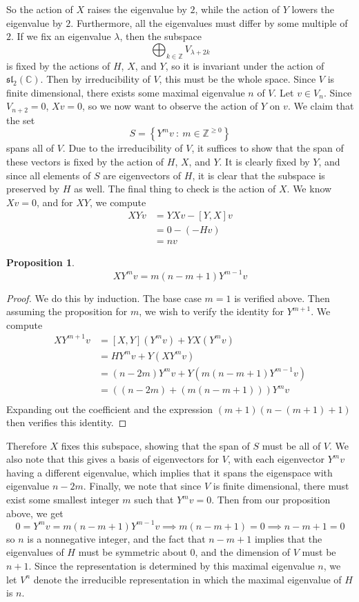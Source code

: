 \documentclass[psamsfonts]{amsart}
\newtheorem{prop}[thm]{Proposition}
\theoremstyle{definition}
\theoremstyle{remark}
\renewcommand{\sl}{\mathfrak{sl}}
\newcommand{\Z}{\mathbb{Z}}
\newcommand{\C}{\mathbb{C}}
\newcommand{\set}[1]{\left\lbrace #1 \right\rbrace}
\begin{document}
%
So the action of $X$ raises the eigenvalue by $2$, while the action of $Y$ lowers
the eigenvalue by $2$. Furthermore, all the eigenvalues must differ by some
multiple of $2$. If we fix an eigenvalue $\lambda$, then the subspace
\[
\bigoplus_{k \in \Z}V_{\lambda + 2k}
\]
is fixed by the actions of $H$, $X$, and $Y$, so it is invariant under the action
of $\sl_2(\C)$. Then by irreducibility of $V$, this must be the whole space.
Since $V$ is finite dimensional, there exists some maximal eigenvalue $n$ of $V$.
Let $v \in V_n$. Since $V_{n+2} = 0$, $Xv = 0$, so we now want to observe the action
of $Y$ on $v$. We claim that the set
\[
S = \set{Y^mv ~:~ m \in \Z^{\geq 0}}
\]
spans all of $V$. Due to the irreducibility of $V$, it suffices to show that
the span of these vectors is fixed by the action of $H$, $X$, and $Y$. It is
clearly fixed by $Y$, and since all elements of $S$ are eigenvectors of $H$, it
is clear that the subspace is preserved by $H$ as well. The final thing to
check is the action of $X$. We know $Xv = 0$, and for $XY$, we compute
%
\begin{align*}
XYv &= YXv - [Y,X]v \\
&= 0 - (-Hv) \\
&= nv
\end{align*}
%
\begin{prop}
\[
XY^mv = m(n-m+1)Y^{m-1}v
\]
\end{prop}
%
\begin{proof}
We do this by induction. The base case $m = 1$ is verified above. Then assuming
the proposition for $m$, we wish to verify the identity for $Y^{m+1}$. We compute
\begin{align*}
XY^{m+1}v &= [X,Y](Y^mv) + YX(Y^mv) \\
&= HY^mv + Y(XY^m v) \\
&= (n-2m)Y^mv + Y(m(n-m+1)Y^{m-1}v) \\
&= ((n-2m)+ (m(n-m+1)))Y^mv \\
\end{align*}
Expanding out the coefficient and the expression $(m+1)(n-(m+1)+1)$ then verifies
this identity.
\end{proof}
%
Therefore $X$ fixes this subspace, showing that the span of $S$ must be all of $V$.
We also note that this gives a basis of eigenvectors for $V$, with each eigenvector
$Y^mv$ having a different eigenvalue, which implies that it spans the eigenspace
with eigenvalue $n - 2m$. Finally, we note that since $V$ is finite dimensional,
there must exist some smallest integer $m$ such that $Y^mv = 0$. Then from our
proposition above, we get
\[
0 = Y^mv = m(n - m + 1)Y^{m-1}v \implies m(n-m+1) = 0 \implies n-m+1 = 0
\]
so $n$ is a nonnegative integer, and the fact that $n-m+1$ implies that the
eigenvalues of $H$ must be symmetric about $0$, and the dimension of $V$ must
be $n+1$. Since the representation is determined by this maximal eigenvalue $n$,
we let $V^n$ denote the irreducible representation in which the maximal eigenvalue
of $H$ is $n$.
\end{document}

